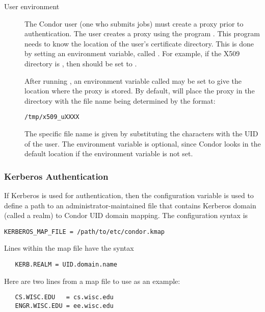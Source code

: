 \begin{description}
\item[User environment]

The Condor user (one who submits jobs) must create a proxy
prior to authentication.
The user creates a proxy using the program
.
This program needs to know 
the location of the user's certificate directory.
This is done by setting an environment variable, called
.
For example, if the X509 directory is ,
then  should be set to .

After running ,
an environment variable called
 may be set to give
the location where the proxy is stored.
By default,
 will place the proxy in the 
directory with
the file name being determined by the format:
\begin{verbatim}
/tmp/x509_uXXXX
\end{verbatim}
The specific file name is given by substituting the \verb@XXXX@
characters with the UID of the user.
The
 environment variable is optional,
since Condor looks in the default location if the environment
variable is not set.


\end{description}

\subsubsection{\label{sec:Kerberos-Authentication}Kerberos Authentication}
If Kerberos is used for authentication, then 
the configuration variable
is used to define a path to an administrator-maintained file that
contains Kerberos domain (called a realm) to Condor UID domain mapping.
The configuration syntax is
\begin{verbatim}
KERBEROS_MAP_FILE = /path/to/etc/condor.kmap
\end{verbatim}

Lines within the map file have the syntax
\begin{verbatim}
   KERB.REALM = UID.domain.name
\end{verbatim}

Here are two lines from a map file to use as an example:
\begin{verbatim}
   CS.WISC.EDU   = cs.wisc.edu
   ENGR.WISC.EDU = ee.wisc.edu
\end{verbatim}

